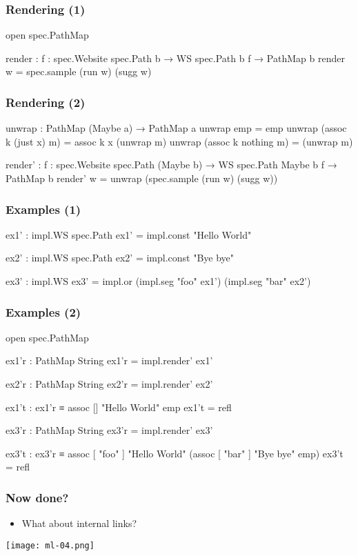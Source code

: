 \documentclass[aspectratio=169]{beamer}
\begin{document}
\begin{frame}
\frametitle{Rendering (1)}
\begin{code}
  open spec.PathMap

  render : {f : spec.Website spec.Path b}
           → WS {spec.Path} {b} {f}
           → PathMap b
  render w = spec.sample (run w) (sugg w)
\end{code}
\end{frame}

\begin{frame}
\frametitle{Rendering (2)}
\begin{code}
  unwrap : PathMap (Maybe a) → PathMap a
  unwrap emp = emp
  unwrap (assoc k (just x) m) = assoc k x (unwrap m)
  unwrap (assoc k nothing m) = (unwrap m)

  render' : {f : spec.Website spec.Path (Maybe b)}
            → WS {spec.Path} {Maybe b} {f}
            → PathMap b
  render' w = unwrap (spec.sample (run w) (sugg w))
\end{code}
\end{frame}

\begin{frame}
\frametitle{Examples (1)}
\begin{code}
ex1' : impl.WS {spec.Path}
ex1' = impl.const "Hello World"

ex2' : impl.WS {spec.Path}
ex2' = impl.const "Bye bye"

ex3' : impl.WS
ex3' = impl.or (impl.seg "foo" ex1')
               (impl.seg "bar" ex2')
\end{code}
\end{frame}

\begin{frame}
\frametitle{Examples (2)}
\begin{code}
open spec.PathMap

ex1'r : PathMap String
ex1'r = impl.render' ex1'

ex2'r : PathMap String
ex2'r = impl.render' ex2'

ex1't : ex1'r ≡ assoc [] "Hello World" emp
ex1't = refl

ex3'r : PathMap String
ex3'r = impl.render' ex3'

ex3't : ex3'r ≡ assoc [ "foo" ] "Hello World"
               (assoc [ "bar" ] "Bye bye"
                emp)
ex3't = refl
\end{code}
\end{frame}


\begin{frame}
\frametitle{Now done?}
\begin{itemize}
  \item What about internal links?
\end{itemize}
\texttt{[image: ml-04.png]}
\end{frame}
\end{document}
